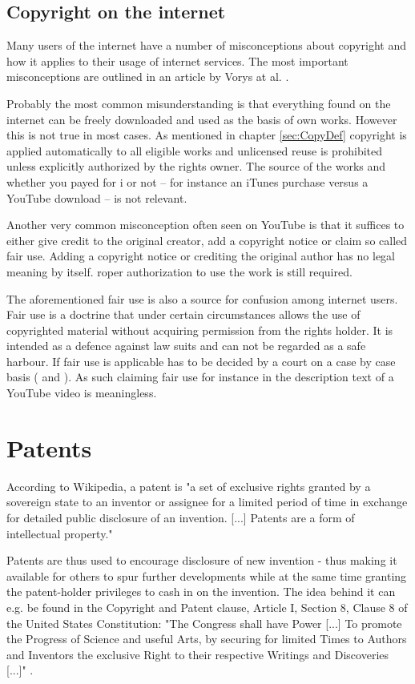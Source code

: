 \documentclass[a4paper]{report}
\begin{document}
\subsection{Copyright on the internet}
Many users of the internet have a number of misconceptions about copyright and how it applies to their usage of internet services. The most important misconceptions are outlined in an article by Vorys at al. \cite{Vorys2013}.

Probably the most common misunderstanding is that everything found on the internet can be freely downloaded and used as the basis of own works. However this is not true in most cases. As mentioned in chapter \ref{sec:CopyDef} copyright is applied automatically to all eligible works and unlicensed reuse is prohibited unless explicitly authorized by the rights owner. The source of the works and whether you payed for i or not -- for instance an iTunes purchase versus a YouTube download -- is not relevant.

Another very common misconception often seen on YouTube is that it suffices to either give credit to the original creator, add a copyright notice or claim so called fair use. Adding a copyright notice or crediting the original author has no legal meaning by itself. roper authorization to use the work is still required.

The aforementioned fair use is also a source for confusion among internet users. Fair use is a doctrine that under certain circumstances allows the use of copyrighted material without acquiring permission from the rights holder. It is intended as a defence against law suits and can not be regarded as a safe harbour. If fair use is applicable has to be decided by a court on a case by case basis (\cite{WikiFair} and \cite{Vorys2013}). As such claiming fair use for instance in the description text of a YouTube video is meaningless.

\section{Patents}
\label{sec:Patents}
According to Wikipedia, a patent is "a set of exclusive rights granted by a sovereign state to an inventor or assignee for a limited period of time in exchange for detailed public disclosure of an invention. [...]  Patents are a form of intellectual property." \parencite{WikiPatent2017}

Patents are thus used to encourage disclosure of new invention - thus making it available for others to spur further developments while at the same time granting the patent-holder privileges to cash in on the invention. The idea behind it can e.g. be found in the Copyright and Patent clause, Article I, Section 8, Clause 8 of the United States Constitution: "The Congress shall have Power [...] To promote the Progress of Science and useful Arts, by securing for limited Times to Authors and Inventors the exclusive Right to their respective Writings and Discoveries [...]" \parencite{Washington1787}.
\end{document}
